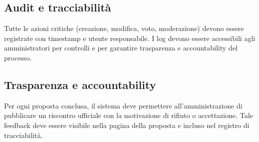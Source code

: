 \subsection{Audit e tracciabilità}
Tutte le azioni critiche (creazione, modifica, voto, moderazione) devono essere registrate con timestamp e utente responsabile.  
I log devono essere accessibili agli amministratori per controlli e per garantire trasparenza e accountability del processo.

\subsection{Trasparenza e accountability}
Per ogni proposta conclusa, il sistema deve permettere all’amministrazione di pubblicare un riscontro ufficiale con la motivazione di rifiuto o accettazione. Tale feedback deve essere visibile nella pagina della proposta e incluso nel registro di tracciabilità.
